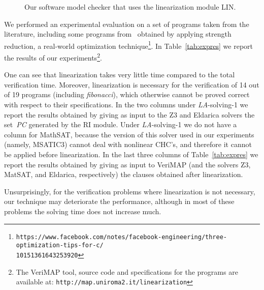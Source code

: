 \documentclass[english]{tlp}
\begin{document}
\vspace*{-2mm}
\begin{figure}[!ht]
\vspace{-2mm}
\centering
{}
\vspace{-4mm}
\caption{Our software model checker that uses the linearization module LIN.\label{fig:RI-LIN-LASolver}
}
\vspace{-3mm}
\end{figure}

We performed an experimental evaluation
on a set of programs taken from the literature,
including some programs from~\cite{Fe&14}
obtained by applying 
strength reduction, 
a real-world optimization technique\footnote{{\tt https://www.facebook.com/notes/facebook-engineering/three-optimization-tips-for-c/\\10151361643253920}}.
In Table~\ref{tab:expres}
we report the results of our experiments\footnote{The VeriMAP tool, source code and specifications for the programs are available at: 
{\tt http://map.uniroma2.it/linearization}}. 

One can see that {\rm linearization} takes very little time
compared to the total verification time.
Moreover, {\rm linearization} is necessary for the verification 
of 14 out of 19 programs (including {\it fibonacci\/}), which otherwise 
cannot be proved correct with respect to their specifications.
In the two columns under {\it LA}-solving-1 
we report the results obtained by giving as input to the  Z3 and 
Eldarica solvers the set~\textit{PC} generated by the RI module.
Under {\it LA}-solving-1 we do not have a column for MathSAT, 
because the version of this solver used in our experiments 
(namely, MSATIC3) cannot deal with nonlinear CHC's, 
and therefore it cannot be applied before linearization.
In the last three columns of Table~\ref{tab:expres} we report the
results obtained by giving as input to VeriMAP (and the solvers Z3, 
MatSAT, and Eldarica, respectively) the clauses obtained after linearization.

Unsurprisingly, for the verification problems where linearization is not necessary, 
our technique may deteriorate the performance, although in most of these problems
the solving time does not increase much.
\end{document}
